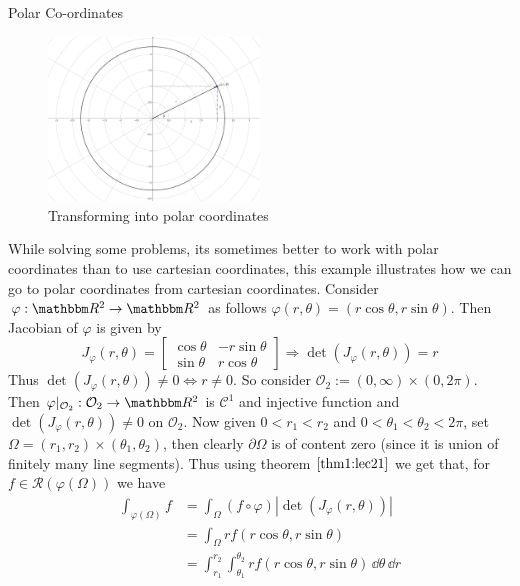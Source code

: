 \documentclass[../Analysis-3]{subfiles}
\begin{document}
\begin{Eg}{Polar Co-ordinates}{}
    \begin{figure}
        \centering
        \includegraphics[width=0.5\textwidth]{../figures/lec21.1.png}
        \caption{Transforming into polar coordinates}
        \label{fig1:21}
    \end{figure}
    While solving some problems, its sometimes better to work with polar coordinates than to use cartesian coordinates, this example illustrates how we can go to polar coordinates from cartesian coordinates.
    Consider $\varphi : \R^2 \to \R^2$ as follows $\varphi(r,\theta) = (r \cos\theta, r \sin\theta)$. Then Jacobian of $\varphi$ is given by
    \[
        J_{\varphi}(r,\theta) = \begin{bmatrix}
            \cos\theta & -r\sin\theta \\
            \sin\theta & r\cos\theta
        \end{bmatrix} \Rightarrow \det(J_{\varphi}(r,\theta)) = r
    \]
    Thus $\det(J_{\varphi}(r,\theta)) \neq 0 \Leftrightarrow r \neq 0$. So consider $\mathcal{O}_2 := (0,\infty) \times (0,2\pi)$. Then $\varphi\vert_{\mathcal{O}_2} : \mathcal{O}_2 \to \R^2$ is $\mathscr{C}^1$ and injective function and $\det(J_{\varphi}(r,\theta)) \neq 0 $ on $\mathcal{O}_2$. Now given $0 < r_1 < r_2$ and $0 < \theta_1 < \theta_2 < 2\pi$, set $\Omega = (r_1, r_2) \times (\theta_1, \theta_2)$, then clearly $\partial \Omega$ is of content zero (since it is union of finitely many line segments). Thus using theorem $\ref{thm1:lec21}$ we get that, for $f \in \mathscr{R}(\varphi(\Omega))$ we have
    \begin{align*}
        \int_{\varphi(\Omega)} f & = \int_{\Omega} (f \circ \varphi) |\det (J_{\varphi}(r,\theta))|                                 \\
                                 & = \int_{\Omega} r f(r\cos\theta, r\sin\theta)                                                    \\
                                 & = \int_{r_1}^{r_2} \int_{\theta_1}^{\theta_2} r f(r\cos\theta, r\sin\theta)\, \dd\theta \, \dd r
    \end{align*}


\end{Eg}
\end{document}
